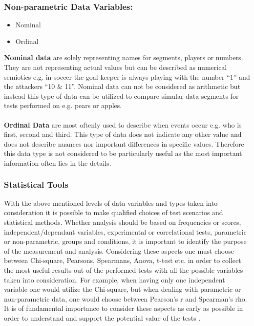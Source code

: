 \subsubsection{Non-parametric Data Variables:}
\begin{itemize}
\item Nominal
\item Ordinal
\end{itemize}
\textbf{Nominal data} are solely representing names for segments, players or numbers. They are not representing actual values but can be described as numerical semiotics e.g. in soccer the goal keeper is always playing with the number “1” and the attackers “10 \& 11”. Nominal data can not be considered as arithmetic but instead this type of data can be utilized to compare simular data segments for tests performed on e.g. pears or apples.\\\\
\textbf{Ordinal Data} are most oftenly used to describe when events occur e.g. who is first, second and third. This type of data does not indicate any other value and does not describe nuances nor important differences in specific values. Therefore this data type is not considered to be particularly useful as the most important information often lies in the details. 
\subsubsection{Statistical Tools}
With the above mentioned levels of data variables and types taken into consideration it is possible to make qualified choices of test scenarios and statistical methods. Whether analysis should be based on frequencies or scores, independent/dependant variables, experimental or correlational tests, parametric or non-parametric, groups and conditions, it is important to identify the purpose of the measurement and analysis. Considering these aspects one must choose between Chi-square, Pearsons, Spearmans, Anova, t-test etc. in order to collect the most useful results out of the performed tests with all the possible variables taken into consideration. For example, when having only one independent variable one would utilize the Chi-square, but when dealing with parametric or non-parametric data, one would choose between Pearson’s r and Spearman’s rho. It is of fundamental importance to consider these aspects as early as possible in order to understand and support the potential value of the tests \citep[page 274]{Design}.
